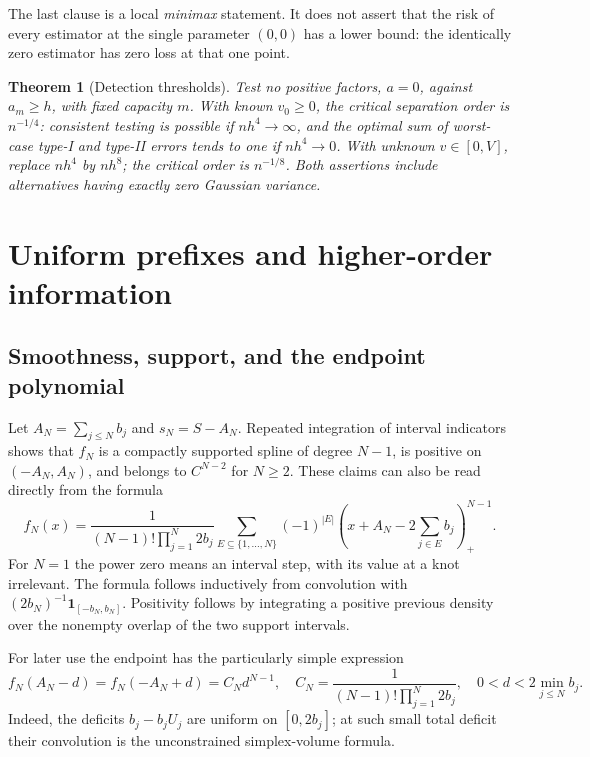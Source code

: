 \documentclass[11pt,a4paper]{article}
\numberwithin{equation}{section}
\newtheorem{theorem}{Theorem}[section]
\theoremstyle{definition}
\theoremstyle{remark}
\newcommand{\ind}{\mathbf 1}
\begin{document}
The last clause is a local \emph{minimax} statement. It does not assert that
the risk of every estimator at the single parameter $(0,0)$ has a lower
bound: the identically zero estimator has zero loss at that one point.

\begin{theorem}[Detection thresholds]
\label{thm:detection-main}
Test no positive factors, $a=0$, against $a_m\ge h$, with fixed capacity
$m$. With known $v_0\ge0$, the critical separation order is $n^{-1/4}$:
consistent testing is possible if $nh^4\to\infty$, and the optimal sum of
worst-case type-I and type-II errors tends to one if $nh^4\to0$.
With unknown $v\in[0,V]$, replace $nh^4$ by $nh^8$; the critical order is
$n^{-1/8}$. Both assertions include alternatives having exactly zero
Gaussian variance.
\end{theorem}

\section{Uniform prefixes and higher-order information}
\label{sec:information}

\subsection{Smoothness, support, and the endpoint polynomial}
Let $A_N=\sum_{j\le N}b_j$ and $s_N=S-A_N$. Repeated integration of interval
indicators shows that $f_N$ is a compactly supported spline of degree
$N-1$, is positive on $(-A_N,A_N)$, and belongs to $C^{N-2}$ for $N\ge2$.
These claims can also be read directly from the formula
\begin{equation}
 f_N(x)=\frac{1}{(N-1)!\prod_{j=1}^N2b_j}
 \sum_{E\subseteq\{1,\ldots,N\}}(-1)^{|E|}
 \left(x+A_N-2\sum_{j\in E}b_j\right)_+^{N-1}.
 \label{eq:spline}
\end{equation}
For $N=1$ the power zero means an interval step, with its value at a knot
irrelevant. The formula follows inductively from convolution with
$(2b_N)^{-1}\ind_{[-b_N,b_N]}$. Positivity follows by integrating a positive
previous density over the nonempty overlap of the two support intervals.

For later use the endpoint has the particularly simple expression
\begin{equation}
 f_N(A_N-d)=f_N(-A_N+d)=C_Nd^{N-1},\quad
 C_N=\frac{1}{(N-1)!\prod_{j=1}^N2b_j},
 \quad 0<d<2\min_{j\le N}b_j.
 \label{eq:endpoint}
\end{equation}
Indeed, the deficits $b_j-b_jU_j$ are uniform on $[0,2b_j]$; at such small
total deficit their convolution is the unconstrained simplex-volume
formula.
\end{document}
